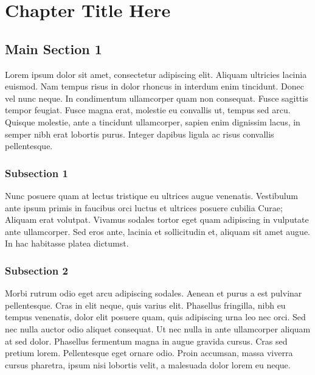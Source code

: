 
\chapter{Chapter Title Here}%
\label{chap:name} %


\section{Main Section 1}

Lorem ipsum dolor sit amet, consectetur adipiscing elit. Aliquam ultricies
lacinia euismod. Nam tempus risus in dolor rhoncus in interdum enim tincidunt.
Donec vel nunc neque. In condimentum ullamcorper quam non consequat. Fusce
sagittis tempor feugiat. Fusce magna erat, molestie eu convallis ut, tempus
sed arcu. Quisque molestie, ante a tincidunt ullamcorper, sapien enim
dignissim lacus, in semper nibh erat lobortis purus. Integer dapibus ligula ac
risus convallis pellentesque.

\subsection{Subsection 1}

Nunc posuere quam at lectus tristique eu ultrices augue venenatis. Vestibulum
ante ipsum primis in faucibus orci luctus et ultrices posuere cubilia Curae;
Aliquam erat volutpat. Vivamus sodales tortor eget quam adipiscing in
vulputate ante ullamcorper. Sed eros ante, lacinia et sollicitudin et, aliquam
sit amet augue. In hac habitasse platea dictumst.


\subsection{Subsection 2}
Morbi rutrum odio eget arcu adipiscing sodales. Aenean et purus a est pulvinar
pellentesque. Cras in elit neque, quis varius elit. Phasellus fringilla, nibh
eu tempus venenatis, dolor elit posuere quam, quis adipiscing urna leo nec
orci. Sed nec nulla auctor odio aliquet consequat. Ut nec nulla in ante
ullamcorper aliquam at sed dolor. Phasellus fermentum magna in augue gravida
cursus. Cras sed pretium lorem. Pellentesque eget ornare odio. Proin accumsan,
massa viverra cursus pharetra, ipsum nisi lobortis velit, a malesuada dolor
lorem eu neque.

